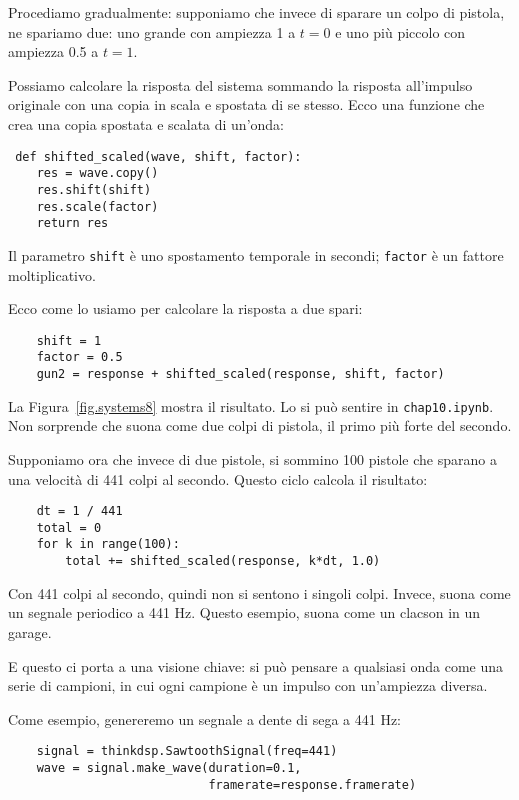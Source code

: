 \documentclass[12pt]{book} \usepackage[width=5.5in,height=8.5in, hmarginratio=3:2,vmarginratio=1:1]{geometry}
\begin{document}
Procediamo gradualmente: supponiamo che invece di sparare un colpo di pistola, ne spariamo due: uno grande con ampiezza 1 a $t=0$ e uno più piccolo con ampiezza 0.5 a $t=1$.

Possiamo calcolare la risposta del sistema sommando la risposta all'impulso originale con una copia in scala e spostata di se stesso. Ecco una funzione che crea una copia spostata e scalata di un'onda:

\begin{verbatim} def shifted_scaled(wave, shift, factor):
    res = wave.copy()
    res.shift(shift)
    res.scale(factor)
    return res
 \end{verbatim} 

Il parametro {\tt shift} è uno spostamento temporale in secondi; {\tt factor} è un fattore moltiplicativo.

Ecco come lo usiamo per calcolare la risposta a due spari:

\begin{verbatim} 
    shift = 1
    factor = 0.5
    gun2 = response + shifted_scaled(response, shift, factor)
 \end{verbatim} 

La Figura~\ref{fig.systems8} mostra il risultato. Lo si può sentire in {\tt chap10.ipynb}. Non sorprende che suona come due colpi di pistola, il primo più forte del secondo.

Supponiamo ora che invece di due pistole, si sommino 100 pistole che sparano a una velocità di 441 colpi al secondo. Questo ciclo calcola il risultato:

\begin{verbatim} 
    dt = 1 / 441
    total = 0
    for k in range(100):
        total += shifted_scaled(response, k*dt, 1.0)
 \end{verbatim} 

Con 441 colpi al secondo, quindi non si sentono i singoli colpi. Invece, suona come un segnale periodico a 441 Hz. Questo esempio, suona come un clacson in un garage.

E questo ci porta a una visione chiave: si può pensare a qualsiasi onda come una serie di campioni, in cui ogni campione è un impulso con un'ampiezza diversa.

Come esempio, genereremo un segnale a dente di sega a 441 Hz:

\begin{verbatim} 
    signal = thinkdsp.SawtoothSignal(freq=441)
    wave = signal.make_wave(duration=0.1,
                            framerate=response.framerate)
 \end{verbatim} 
\end{document}
